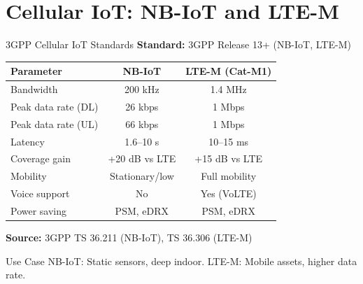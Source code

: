 \documentclass[aspectratio=169,11pt]{beamer}
\begin{document}
\section{Cellular IoT: NB-IoT and LTE-M}

\begin{frame}{3GPP Cellular IoT Standards}
    \textbf{Standard:} 3GPP Release 13+ (NB-IoT, LTE-M)
    
    \vspace{0.3cm}
    \begin{table}
        \centering
        \small
        \begin{tabular}{@{}lcc@{}}
            \toprule
            \textbf{Parameter} & \textbf{NB-IoT} & \textbf{LTE-M (Cat-M1)} \\
            \midrule
            Bandwidth & 200 kHz & 1.4 MHz \\
            Peak data rate (DL) & 26 kbps & 1 Mbps \\
            Peak data rate (UL) & 66 kbps & 1 Mbps \\
            Latency & 1.6--10 s & 10--15 ms \\
            Coverage gain & +20 dB vs LTE & +15 dB vs LTE \\
            Mobility & Stationary/low & Full mobility \\
            Voice support & No & Yes (VoLTE) \\
            Power saving & PSM, eDRX & PSM, eDRX \\
            \bottomrule
        \end{tabular}
    \end{table}
    
    \vspace{0.2cm}
    \textbf{Source:} 3GPP TS 36.211 (NB-IoT), TS 36.306 (LTE-M)
    
    \vspace{0.2cm}
    \begin{block}{Use Case}
        NB-IoT: Static sensors, deep indoor. LTE-M: Mobile assets, higher data rate.
    \end{block}
\end{frame}
\end{document}
